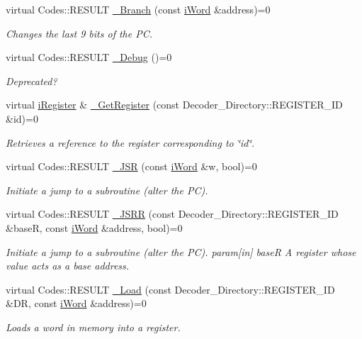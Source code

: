 \begin{DoxyCompactItemize}
virtual Codes::RESULT \hyperlink{classiWi11_a42d2c50609424634873413d7a6614397}{\_\-Branch} (const \hyperlink{classiWord}{iWord} \&address)=0
\begin{DoxyCompactList}\small\item\em Changes the last 9 bits of the PC. \item\end{DoxyCompactList}\item 
virtual Codes::RESULT \hyperlink{classiWi11_ae510f127a0c3b87d42cdbe5b14204a65}{\_\-Debug} ()=0
\begin{DoxyCompactList}\small\item\em Deprecated? \item\end{DoxyCompactList}\item 
virtual \hyperlink{classiRegister}{iRegister} \& \hyperlink{classiWi11_a00f9ff87c8948464f435f00b10d20dfd}{\_\-GetRegister} (const Decoder\_\-Directory::REGISTER\_\-ID \&id)=0
\begin{DoxyCompactList}\small\item\em Retrieves a reference to the register corresponding to \char`\"{}id\char`\"{}. \item\end{DoxyCompactList}\item 
virtual Codes::RESULT \hyperlink{classiWi11_a44e0e3fef9c35401b5a026fb448e872c}{\_\-JSR} (const \hyperlink{classiWord}{iWord} \&w, bool)=0
\begin{DoxyCompactList}\small\item\em Initiate a jump to a subroutine (alter the PC). \item\end{DoxyCompactList}\item 
virtual Codes::RESULT \hyperlink{classiWi11_ac8fece98ceab4592a5761e6917b5b7a2}{\_\-JSRR} (const Decoder\_\-Directory::REGISTER\_\-ID \&baseR, const \hyperlink{classiWord}{iWord} \&address, bool)=0
\begin{DoxyCompactList}\small\item\em Initiate a jump to a subroutine (alter the PC). param\mbox{[}in\mbox{]} baseR A register whose value acts as a base address. \item\end{DoxyCompactList}\item 
virtual Codes::RESULT \hyperlink{classiWi11_a8dac5a6aca2f4c6b398d9a0c44297226}{\_\-Load} (const Decoder\_\-Directory::REGISTER\_\-ID \&DR, const \hyperlink{classiWord}{iWord} \&address)=0
\begin{DoxyCompactList}\small\item\em Loads a word in memory into a register. \item\end{DoxyCompactList}\item 

\end{DoxyCompactItemize}
